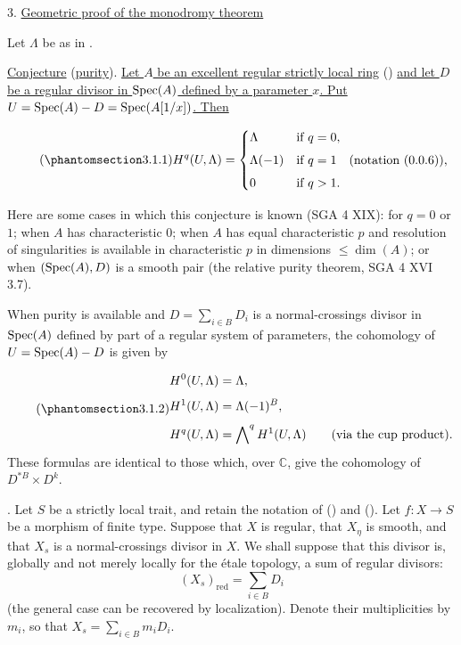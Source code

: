 
3. \underline{Geometric proof of the monodromy theorem}

Let $\Lambda$ be as in .

\underline{Conjecture}  (\underline{purity}). \underline{Let $A$ be an
excellent regular strictly local ring} () \underline{and let $D$ be a
regular divisor in $\operatorname{Spec}(A)$ defined by a parameter $x$. Put
$U=\operatorname{Spec}(A)-D=\operatorname{Spec}(A[1/x])$. Then}

\begin{equation}\tag{\SGARefTarget{sga7.sga7i.ei.n3-1-1}{3.1.1}}
H^{q}(U,\Lambda)=
\begin{cases}
\Lambda & \text{if }q=0,\\[4pt]
\Lambda(-1) & \text{if }q=1\quad\text{(notation (\SGARefLink{sga7.sga7i.ei.n0-0-6}{0.0.6})),}\\[4pt]
0 & \text{if }q>1.
\end{cases}
\end{equation}

Here are some cases in which this conjecture is known (SGA 4 XIX): for
$q=0$ or $1$; when $A$ has characteristic $0$; when $A$ has equal
characteristic $p$ and resolution of singularities is available in
characteristic $p$ in dimensions $\leqslant\dim(A)$; or when
$(\operatorname{Spec}(A),D)$ is a smooth pair (the relative purity theorem, SGA 4 XVI
3.7).

When purity is available and
$D=\sum_{i\in B}D_i$ is a normal-crossings divisor in $\operatorname{Spec}(A)$ defined
by part of a regular system of parameters, the cohomology of
$U=\operatorname{Spec}(A)-D$ is given by


\begin{equation}\tag{\SGARefTarget{sga7.sga7i.ei.n3-1-2}{3.1.2}}
\begin{aligned}
H^0(U,\Lambda)&=\Lambda,\\[4pt]
H^1(U,\Lambda)&=\Lambda(-1)^B,\\[4pt]
H^q(U,\Lambda)&=\bigwedge\nolimits^q H^1(U,\Lambda)
  \qquad\text{(via the cup product).}
\end{aligned}
\end{equation}
These formulas are identical to those which, over $\mathbb C$, give the
cohomology of $D^{*B}\times D^k$.

. Let $S$ be a strictly local trait, and retain the notation of
() and (). Let $f:X\longrightarrow S$ be a morphism of finite
type. Suppose that $X$ is regular, that $X_\eta$ is smooth, and that
$X_s$ is a normal-crossings divisor in $X$. We shall suppose that this
divisor is, globally and not merely locally for the \'{e}tale topology, a
sum of regular divisors:
\[
(X_s)_{\mathrm{red}}=\sum_{i\in B}D_i
\]
(the general case can be recovered by localization). Denote their
multiplicities by $m_i$, so that
$X_s=\sum_{i\in B}m_iD_i$.

